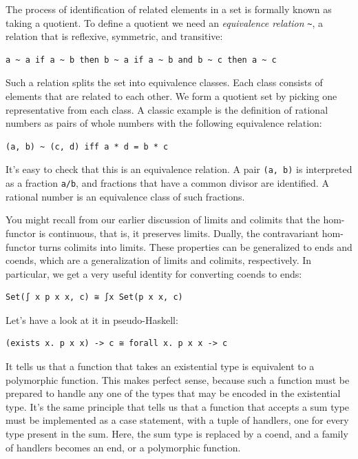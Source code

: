 The process of identification of related elements in a set is formally
known as taking a quotient. To define a quotient we need an
\emph{equivalence relation} \texttt{\textasciitilde{}}, a relation that
is reflexive, symmetric, and transitive:

\begin{verbatim}
a ~ a if a ~ b then b ~ a if a ~ b and b ~ c then a ~ c
\end{verbatim}

Such a relation splits the set into equivalence classes. Each class
consists of elements that are related to each other. We form a quotient
set by picking one representative from each class. A classic example is
the definition of rational numbers as pairs of whole numbers with the
following equivalence relation:

\begin{verbatim}
(a, b) ~ (c, d) iff a * d = b * c
\end{verbatim}

It's easy to check that this is an equivalence relation. A pair
\texttt{(a,\ b)} is interpreted as a fraction \texttt{a/b}, and
fractions that have a common divisor are identified. A rational number
is an equivalence class of such fractions.

You might recall from our earlier discussion of limits and colimits that
the hom-functor is continuous, that is, it preserves limits. Dually, the
contravariant hom-functor turns colimits into limits. These properties
can be generalized to ends and coends, which are a generalization of
limits and colimits, respectively. In particular, we get a very useful
identity for converting coends to ends:

\begin{verbatim}
Set(∫ x p x x, c) ≅ ∫x Set(p x x, c)
\end{verbatim}

Let's have a look at it in pseudo-Haskell:

\begin{verbatim}
(exists x. p x x) -> c ≅ forall x. p x x -> c
\end{verbatim}

It tells us that a function that takes an existential type is equivalent
to a polymorphic function. This makes perfect sense, because such a
function must be prepared to handle any one of the types that may be
encoded in the existential type. It's the same principle that tells us
that a function that accepts a sum type must be implemented as a case
statement, with a tuple of handlers, one for every type present in the
sum. Here, the sum type is replaced by a coend, and a family of handlers
becomes an end, or a polymorphic function.

